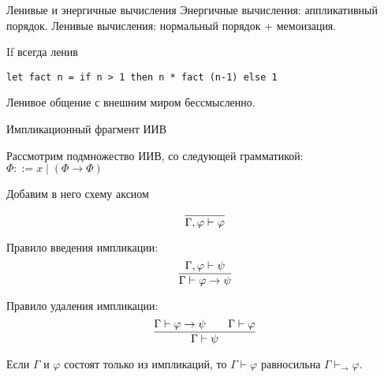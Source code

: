 \documentclass[aspectratio=169]{beamer}
\begin{document}
\begin{frame}{Ленивые и энергичные вычисления}
Энергичные вычисления: аппликативный порядок.
Ленивые вычисления: нормальный порядок + мемоизация.

If всегда ленив

\begin{center}
\texttt{let fact n = if n > 1 then n * fact (n-1) else 1}
\end{center}

Ленивое общение с внешним миром бессмысленно.
\end{frame}

\begin{frame}{Импликационный фрагмент ИИВ}

Рассмотрим подмножество ИИВ, со следующей грамматикой:
$\Phi ::= x \; | \; (\Phi \rightarrow \Phi)$

Добавим в него схему аксиом

$$\infer{\Gamma, \varphi \vdash \varphi}{}$$

	Правило введения импликации:
	\[
	\infer{\Gamma \vdash \varphi \to \psi}{\Gamma, \varphi \vdash \psi}
	\]

	Правило удаления импликации:
	\[
	\infer{\Gamma \vdash \psi}{\Gamma \vdash \varphi \to \psi && \Gamma \vdash \varphi}
	\]

\begin{thm}	
	Если $\Gamma$ и $\varphi$ состоят только из импликаций, то $\Gamma \vdash \varphi$ равносильна $\Gamma \vdash_\rightarrow \varphi$.
\end{thm}
\end{frame}
\end{document}
